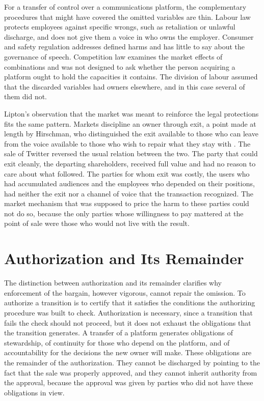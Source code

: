 \documentclass[11pt]{article}
\theoremstyle{definition}
\begin{document}
For a transfer of control over a communications platform, the complementary procedures that might have covered the omitted variables are thin. Labour law protects employees against specific wrongs, such as retaliation or unlawful discharge, and does not give them a voice in who owns the employer. Consumer and safety regulation addresses defined harms and has little to say about the governance of speech. Competition law examines the market effects of combinations and was not designed to ask whether the person acquiring a platform ought to hold the capacities it contains. The division of labour assumed that the discarded variables had owners elsewhere, and in this case several of them did not.

Lipton's observation that the market was meant to reinforce the legal protections fits the same pattern. Markets discipline an owner through exit, a point made at length by Hirschman, who distinguished the exit available to those who can leave from the voice available to those who wish to repair what they stay with \cite{hirschman1970}. The sale of Twitter reversed the usual relation between the two. The party that could exit cleanly, the departing shareholders, received full value and had no reason to care about what followed. The parties for whom exit was costly, the users who had accumulated audiences and the employees who depended on their positions, had neither the exit nor a channel of voice that the transaction recognized. The market mechanism that was supposed to price the harm to these parties could not do so, because the only parties whose willingness to pay mattered at the point of sale were those who would not live with the result.

\section{Authorization and Its Remainder}

The distinction between authorization and its remainder clarifies why enforcement of the bargain, however vigorous, cannot repair the omission. To authorize a transition is to certify that it satisfies the conditions the authorizing procedure was built to check. Authorization is necessary, since a transition that fails the check should not proceed, but it does not exhaust the obligations that the transition generates. A transfer of a platform generates obligations of stewardship, of continuity for those who depend on the platform, and of accountability for the decisions the new owner will make. These obligations are the remainder of the authorization. They cannot be discharged by pointing to the fact that the sale was properly approved, and they cannot inherit authority from the approval, because the approval was given by parties who did not have these obligations in view.
\end{document}

